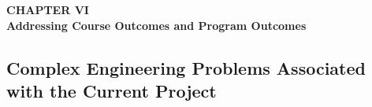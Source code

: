 \section*{}
\begin{center}
    {\fontsize{14}{1.5}\selectfont \textbf{CHAPTER VI}}\\
    \vspace{12pt}
    {\fontsize{16}{1.5}\selectfont \textbf{Addressing Course Outcomes and Program Outcomes}}\\
    \vspace{12pt}
    \vspace{12pt}
\end{center}

\setcounter{section}{6}
\setcounter{subsection}{0}
\setcounter{table}{0}
\setcounter{figure}{0}


\subsection{Complex Engineering Problems Associated with the Current Project}





